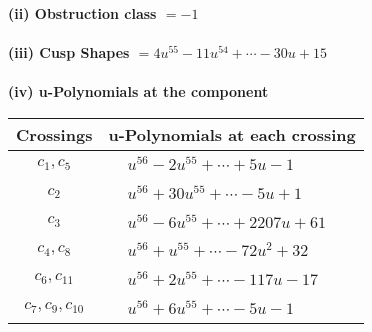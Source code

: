 \documentclass[1p]{elsarticle_modified}
\theoremstyle{definition}
\begin{document}
\flushleft \textbf{(ii) Obstruction class $= -1$}\\~\\
\flushleft \textbf{(iii) Cusp Shapes $= 4 u^{55}-11 u^{54}+\cdots-30 u+15$}\\~\\
\newpage\renewcommand{\arraystretch}{1}
\flushleft \textbf{(iv) u-Polynomials at the component}\newline \\
\begin{tabular}{m{50pt}|m{274pt}}
Crossings & \hspace{64pt}u-Polynomials at each crossing \\
\hline $$\begin{aligned}c_{1},c_{5}\end{aligned}$$&$\begin{aligned}
&u^{56}-2 u^{55}+\cdots+5 u-1
\end{aligned}$\\
\hline $$\begin{aligned}c_{2}\end{aligned}$$&$\begin{aligned}
&u^{56}+30 u^{55}+\cdots-5 u+1
\end{aligned}$\\
\hline $$\begin{aligned}c_{3}\end{aligned}$$&$\begin{aligned}
&u^{56}-6 u^{55}+\cdots+2207 u+61
\end{aligned}$\\
\hline $$\begin{aligned}c_{4},c_{8}\end{aligned}$$&$\begin{aligned}
&u^{56}+u^{55}+\cdots-72 u^2+32
\end{aligned}$\\
\hline $$\begin{aligned}c_{6},c_{11}\end{aligned}$$&$\begin{aligned}
&u^{56}+2 u^{55}+\cdots-117 u-17
\end{aligned}$\\
\hline $$\begin{aligned}c_{7},c_{9},c_{10}\end{aligned}$$&$\begin{aligned}
&u^{56}+6 u^{55}+\cdots-5 u-1
\end{aligned}$\\
\hline
\end{tabular}\\~\\
\end{document}
